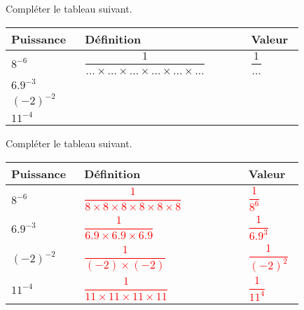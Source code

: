 \begin{exercice*}
    Compléter le tableau suivant.    
    \newcommand{\phantomRule}{\rule[-4.5mm]{0cm}{10mm}}

    \begin{tabular}{|>{\centering\arraybackslash}m{0.2\linewidth}|>{\centering\arraybackslash}m{0.5\linewidth}|>{\centering\arraybackslash}m{0.13\linewidth}|}
        \hline
        \rowcolor{gray!20}Puissance&Définition&Valeur\\\hline
        \phantomRule $8^{-6}$&\phantomRule $\dfrac{1}{\ldots\times\ldots\times\ldots\times\ldots\times\ldots\times\ldots}$&\phantomRule $\dfrac{1}{\ldots}$ \\\hline
        \phantomRule $\num{6.9}^{-3}$&\phantomRule&\phantomRule \\\hline
        \phantomRule $(-2)^{-2}$&\phantomRule&\phantomRule \\\hline
        \phantomRule $11^{-4}$&\phantomRule&\phantomRule \\\hline
    \end{tabular}

\end{exercice*}
\begin{corrige}
    Compléter le tableau suivant.    
    \newcommand{\phantomRule}{\rule[-4.5mm]{0cm}{10mm}}

    \begin{tabular}{|>{\centering\arraybackslash}m{0.2\linewidth}|>{\centering\arraybackslash}m{0.5\linewidth}|>{\centering\arraybackslash}m{0.13\linewidth}|}
        \hline
        \rowcolor{gray!20}Puissance&Définition&Valeur\\\hline
        \phantomRule $8^{-6}$&\phantomRule\textcolor{red}{$\dfrac{1}{8\times 8\times 8\times 8\times 8\times 8}$}&\phantomRule\textcolor{red}{$\dfrac{1}{8^6}$} \\\hline
        \phantomRule $\num{6.9}^{-3}$&\phantomRule\textcolor{red}{$\dfrac{1}{\num{6.9}\times\num{6.9}\times\num{6.9}}$}&\phantomRule\textcolor{red}{$\dfrac{1}{\num{6.9}^3}$} \\\hline
        \phantomRule $(-2)^{-2}$&\phantomRule\textcolor{red}{$\dfrac{1}{(-2)\times(-2)}$}&\phantomRule\textcolor{red}{$\dfrac{1}{(-2)^2}$} \\\hline
        \phantomRule $11^{-4}$&\phantomRule\textcolor{red}{$\dfrac{1}{11\times 11\times 11\times 11}$}&\phantomRule\textcolor{red}{$\dfrac{1}{11^4}$} \\\hline
    \end{tabular}

\end{corrige}

